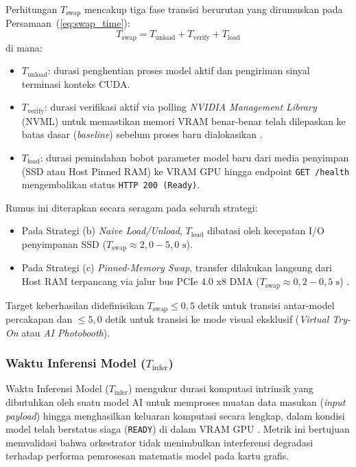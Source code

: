 Perhitungan $T_{\text{swap}}$ mencakup tiga fase transisi berurutan yang dirumuskan pada Persamaan~(\ref{eq:swap_time}):
\begin{equation}
    T_{\text{swap}} = T_{\text{unload}} + T_{\text{verify}} + T_{\text{load}}
    \label{eq:swap_time}
\end{equation}
di mana:
\begin{itemize}
    \item $T_{\text{unload}}$: durasi penghentian proses model aktif dan pengiriman sinyal terminasi konteks CUDA.
    \item $T_{\text{verify}}$: durasi verifikasi aktif via polling \textit{NVIDIA Management Library} (NVML) untuk memastikan memori VRAM benar-benar telah dilepaskan ke batas dasar (\textit{baseline}) sebelum proses baru dialokasikan \cite{nvidia2026containertoolkit}.
    \item $T_{\text{load}}$: durasi pemindahan bobot parameter model baru dari media penyimpan (SSD atau Host Pinned RAM) ke VRAM GPU hingga endpoint \texttt{GET /health} mengembalikan status \texttt{HTTP 200 (Ready)}.
\end{itemize}

Rumus ini diterapkan secara seragam pada seluruh strategi:
\begin{itemize}
    \item Pada Strategi (b) \textit{Naive Load/Unload}, $T_{\text{load}}$ dibatasi oleh kecepatan I/O penyimpanan SSD ($T_{\text{swap}} \approx 2{,}0 - 5{,}0\text{ s}$).
    \item Pada Strategi (c) \textit{Pinned-Memory Swap}, transfer dilakukan langsung dari Host RAM terpancang via jalur bus PCIe 4.0 x8 DMA ($T_{\text{swap}} \approx 0{,}2 - 0{,}5\text{ s}$) \cite{hu2023cec, woo2025exploring}.
\end{itemize}
Target keberhasilan didefinisikan $T_{\text{swap}} \le 0{,}5\text{ detik}$ untuk transisi antar-model percakapan dan $\le 5{,}0\text{ detik}$ untuk transisi ke mode visual eksklusif (\textit{Virtual Try-On} atau \textit{AI Photobooth}).

\subsubsection{Waktu Inferensi Model ($T_{\text{infer}}$)}
Waktu Inferensi Model ($T_{\text{infer}}$) mengukur durasi komputasi intrinsik yang dibutuhkan oleh suatu model AI untuk memproses muatan data masukan (\textit{input payload}) hingga menghasilkan keluaran komputasi secara lengkap, dalam kondisi model telah berstatus siaga (\texttt{READY}) di dalam VRAM GPU \cite{chen2022minideep, zhang2025adaptive}. Metrik ini bertujuan memvalidasi bahwa orkestrator tidak menimbulkan interferensi degradasi terhadap performa pemrosesan matematis model pada kartu grafis.

